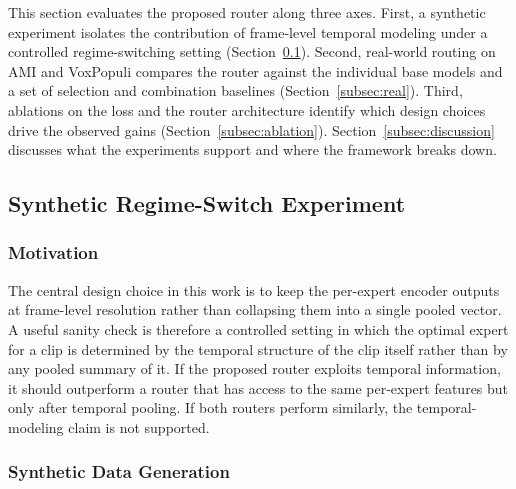 \documentclass[journal]{IEEEtran}
\begin{document}
This section evaluates the proposed router along three axes. First, a
synthetic experiment isolates the contribution of frame-level
temporal modeling under a controlled regime-switching setting
(Section~\ref{subsec:synthetic}). Second, real-world routing on AMI
and VoxPopuli compares the router against the individual base
models and a set of selection and combination baselines
(Section~\ref{subsec:real}). Third, ablations on the loss and the
router architecture identify which design choices drive the observed
gains (Section~\ref{subsec:ablation}). Section~\ref{subsec:discussion}
discusses what the experiments support and where the framework breaks
down.


\subsection{Synthetic Regime-Switch Experiment}
\label{subsec:synthetic}

\subsubsection{Motivation}

The central design choice in this work is to keep the per-expert
encoder outputs at frame-level resolution rather than collapsing them
into a single pooled vector. A useful sanity check is therefore a
controlled setting in which the optimal expert for a clip is
determined by the temporal structure of the clip itself rather
than by any pooled summary of it. If the proposed router exploits
temporal information, it should outperform a router that has access
to the same per-expert features but only after temporal pooling. If
both routers perform similarly, the temporal-modeling claim is not
supported.

\subsubsection{Synthetic Data Generation}
\end{document}
